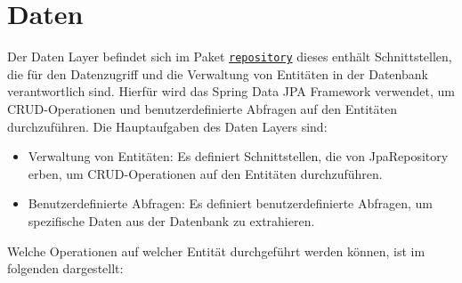 
\chapter{Daten}
\label{ch:data}

Der Daten Layer befindet sich im Paket \hyperref[edu.kit.hci.soli.repository]{\texttt{repository}} dieses enthält Schnittstellen, die für den Datenzugriff und die Verwaltung von Entitäten in der Datenbank verantwortlich sind. 
Hierfür wird das Spring Data JPA Framework verwendet, um \gls{CRUD}-Operationen und benutzerdefinierte Abfragen auf den Entitäten durchzuführen.  
Die Hauptaufgaben des Daten Layers sind:

\begin{itemize}
    \item Verwaltung von Entitäten: Es definiert Schnittstellen, die von JpaRepository erben, um CRUD-Operationen auf den Entitäten durchzuführen.
    \item Benutzerdefinierte Abfragen: Es definiert benutzerdefinierte Abfragen, um spezifische Daten aus der Datenbank zu extrahieren.
\end{itemize}

Welche Operationen auf welcher Entität durchgeführt werden können, ist im folgenden dargestellt: 

